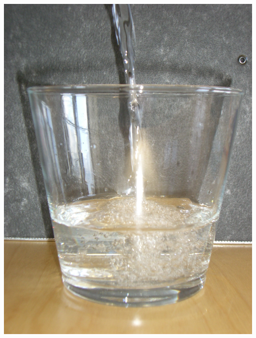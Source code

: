 \documentclass{cssheet}
\begin{document}
\begin{aufgabe}[Füllgraphen]
\begin{minipage}{.33\textwidth}
		\includegraphics[width=\linewidth]{Gefaess_B_1.jpg}
	\end{minipage}
	\begin{minipage}{.33\textwidth}

\end{minipage}
\end{aufgabe}
\end{document}
